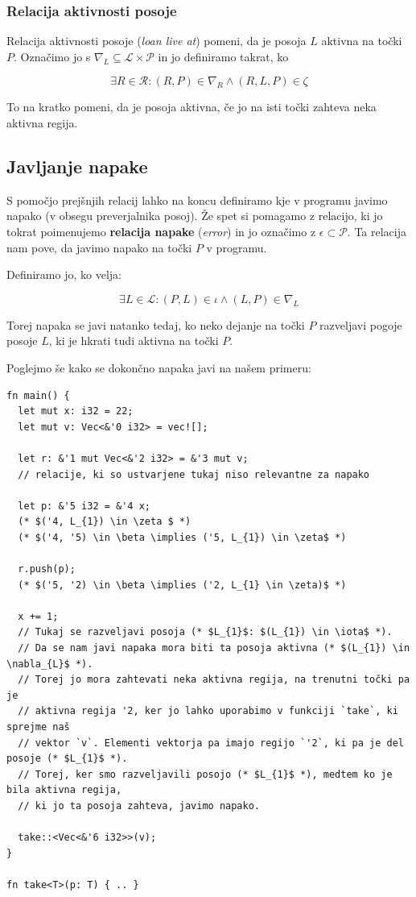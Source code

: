 \documentclass{article}
\begin{document}
\subsubsection{Relacija aktivnosti posoje}

Relacija aktivnosti posoje (\textit{loan live at}) pomeni, da je posoja $L$ aktivna na točki $P$. Označimo jo s
$\nabla_{L} \subseteq \mathcal{L} \times \mathcal{P}$ in jo definiramo takrat, ko

\[ \exists R \in \mathcal{R}: (R,P) \in \nabla_{R} \land (R,L,P) \in \zeta \]

To na kratko pomeni, da je posoja aktivna, če jo na isti točki zahteva neka aktivna regija.

\subsection{Javljanje napake}

S pomočjo prejšnjih relacij lahko na koncu definiramo kje v programu javimo napako (v obsegu preverjalnika posoj).
Že spet si pomagamo z relacijo, ki jo tokrat poimenujemo \textbf{relacija napake} (\textit{error}) in jo označimo z
$\epsilon \subset \mathcal{P}$. Ta relacija nam pove, da javimo napako na točki $P$ v programu.

Definiramo jo, ko velja:

\[ \exists L \in \mathcal{L}: (P, L) \in \iota \land (L,P) \in \nabla_{L} \]

Torej napaka se javi natanko tedaj, ko neko dejanje na točki $P$ razveljavi pogoje posoje $L$, ki je hkrati tudi
aktivna na točki $P$.

Poglejmo še kako se dokončno napaka javi na našem primeru:

\begin{lstlisting}
fn main() {
  let mut x: i32 = 22;
  let mut v: Vec<&'0 i32> = vec![];

  let r: &'1 mut Vec<&'2 i32> = &'3 mut v;
  // relacije, ki so ustvarjene tukaj niso relevantne za napako 

  let p: &'5 i32 = &'4 x;
  (* $('4, L_{1}) \in \zeta $ *)
  (* $('4, '5) \in \beta \implies ('5, L_{1}) \in \zeta$ *)

  r.push(p);
  (* $('5, '2) \in \beta \implies ('2, L_{1} \in \zeta)$ *)
  
  x += 1;
  // Tukaj se razveljavi posoja (* $L_{1}$: $(L_{1}) \in \iota$ *).
  // Da se nam javi napaka mora biti ta posoja aktivna (* $(L_{1}) \in \nabla_{L}$ *).
  // Torej jo mora zahtevati neka aktivna regija, na trenutni točki pa je 
  // aktivna regija '2, ker jo lahko uporabimo v funkciji `take`, ki sprejme naš 
  // vektor `v`. Elementi vektorja pa imajo regijo `'2`, ki pa je del posoje (* $L_{1}$ *).
  // Torej, ker smo razveljavili posojo (* $L_{1}$ *), medtem ko je bila aktivna regija,
  // ki jo ta posoja zahteva, javimo napako.

  take::<Vec<&'6 i32>>(v);
}

fn take<T>(p: T) { .. }
\end{lstlisting}

\printbibliography
\end{document}
